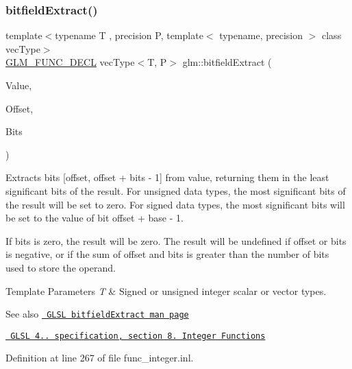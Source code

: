 \subsubsection{\texorpdfstring{bitfieldExtract()}{bitfieldExtract()}}
{\footnotesize\ttfamily template$<$typename T , precision P, template$<$ typename, precision $>$ class vec\+Type$>$ \\
\mbox{\hyperlink{setup_8hpp_ab2d052de21a70539923e9bcbf6e83a51}{G\+L\+M\+\_\+\+F\+U\+N\+C\+\_\+\+D\+E\+CL}} vec\+Type$<$T, P$>$ glm\+::bitfield\+Extract (\begin{DoxyParamCaption}\item[{vec\+Type$<$ T, P $>$ const \&}]{Value,  }\item[{int}]{Offset,  }\item[{int}]{Bits }\end{DoxyParamCaption})}

Extracts bits \mbox{[}offset, offset + bits -\/ 1\mbox{]} from value, returning them in the least significant bits of the result. For unsigned data types, the most significant bits of the result will be set to zero. For signed data types, the most significant bits will be set to the value of bit offset + base -\/ 1.

If bits is zero, the result will be zero. The result will be undefined if offset or bits is negative, or if the sum of offset and bits is greater than the number of bits used to store the operand.


\begin{DoxyTemplParams}{Template Parameters}
{\em T} & Signed or unsigned integer scalar or vector types.\\
\hline
\end{DoxyTemplParams}
\begin{DoxySeeAlso}{See also}
\href{http://www.opengl.org/sdk/docs/manglsl/xhtml/bitfieldExtract.xml}{\texttt{ G\+L\+SL bitfield\+Extract man page}} 

\href{http://www.opengl.org/registry/doc/GLSLangSpec.4.20.8.pdf}{\texttt{ G\+L\+SL 4.. specification, section 8. Integer Functions}} 
\end{DoxySeeAlso}


Definition at line 267 of file func\+\_\+integer.\+inl.

\mbox{\label{group__core__func__integer_ga5681dfac9239beb1b8bd995e3c6496d7}} 
